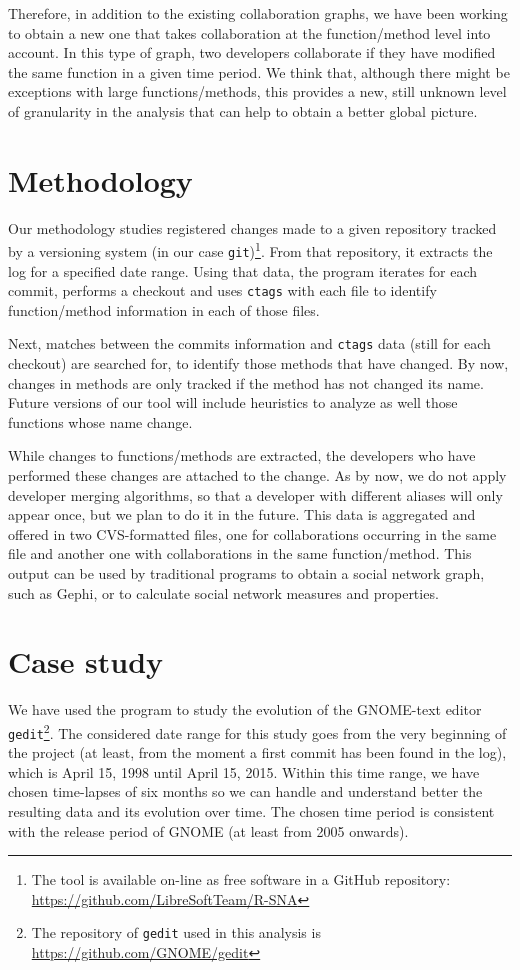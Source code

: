 \documentclass[a4paper]{article}
\begin{document}
Therefore, in addition to the existing collaboration graphs, we have been working
to obtain a new one that takes collaboration at the function/method level into
account. In this type of graph, two developers collaborate if they have modified
the same function in a given time period. We think that, although there might
be exceptions with large functions/methods, this provides a new, still unknown
level of granularity in the analysis that can help to obtain a better global 
picture.

\section{Methodology}

Our methodology studies registered changes made to a given repository tracked by
a versioning system (in our case \texttt{git})\footnote{The tool is available on-line as free software in a GitHub repository: \url{https://github.com/LibreSoftTeam/R-SNA}}. 
From that repository, it extracts the log for a specified date range. Using
that data, the program iterates for each commit, performs a checkout
and uses \texttt{ctags} with each file to identify function/method information
in each of those files.

Next, matches between the commits information and \texttt{ctags} data
(still for each checkout) are searched for, to identify those methods that have
changed. By now, changes in methods are only tracked if the method has not 
changed its name. Future versions of our tool will include heuristics to analyze
as well those functions whose name change.

While changes to functions/methods are extracted, the developers who have performed
these changes are attached to the change. As by now, we do not apply developer merging
algorithms, so that a developer with different aliases will only appear once,
but we plan to do it in the future. This data is aggregated and offered
in two CVS-formatted files, one for collaborations occurring in the same file
and another one with collaborations in the same function/method. This output
can be used by traditional programs to obtain a social network graph, such as
Gephi, or to calculate social network measures and properties.

\section{Case study}

We have used the program to study the evolution of the GNOME-text editor \texttt{gedit}\footnote{The repository of \texttt{gedit} used in this analysis is \url{https://github.com/GNOME/gedit}}.
The considered date range for this study goes from the very beginning of
the project (at least, from the moment a first commit has been found in the log), which is April
15, 1998 until April 15, 2015.
Within this time range, we have chosen time-lapses of six months so
we can handle and understand better the resulting data and its evolution
over time. The chosen time period is consistent with the release period of GNOME 
(at least from 2005 onwards).
\end{document}
